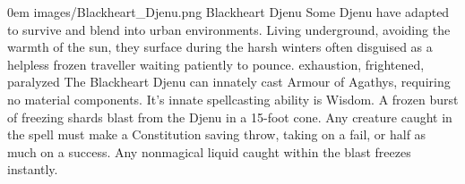 \documentclass[letterpaper,openany,oneside,twocolumn]{book}
\begin{document}
\vfill\eject

\MonsterVariant%
	{0em}%
	{images/Blackheart_Djenu.png}%
	{Blackheart Djenu}%
	{%
		Some Djenu have adapted to survive and blend into urban environments. Living underground, avoiding the warmth of the sun, they surface during the harsh winters often disguised as a helpless frozen traveller waiting patiently to pounce.
		exhaustion, frightened, paralyzed
		The Blackheart Djenu can innately cast Armour of Agathys, requiring  no material components. It's innate spellcasting ability is Wisdom.
		A frozen burst of freezing shards blast from the Djenu in a 15-foot cone. Any creature caught in the spell must make a Constitution saving throw, taking  on a fail, or half as much on a success. Any nonmagical liquid caught within the blast freezes instantly.
	}%
\end{document}
